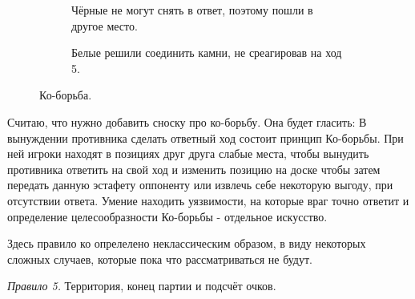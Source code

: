 \documentclass[14pt,a4paper]{extarticle}
\newcommand{\stone}[3]{\filldraw[color=black, fill=#3, very thick](#1,#2) circle(0.45);}
\newcommand{\stonelabel}[4]{\node[text=#3] at (#1,#2) {#4};}
\begin{document}
\begin{figure}[H]
    \begin{subfigure}[t]{0.4\textwidth}
    \caption{Чёрные не могут снять в ответ, поэтому пошли в другое место.}
    \label{9e}
    \end{subfigure}
    \hfill
    \begin{subfigure}[t]{0.4\textwidth}
    \caption{Белые решили соединить камни, не среагировав на ход 5.}
    \label{9f}
    \end{subfigure}
    \caption{Ко-борьба.}
    \label{9}
\end{figure}

Считаю, что нужно добавить сноску про ко-борьбу. Она будет гласить: В вынуждении противника сделать ответный ход состоит принцип Ко-борьбы. При ней игроки находят в позициях друг друга слабые места, чтобы вынудить противника ответить на свой ход и изменить позицию на доске чтобы затем передать данную эстафету оппоненту или извлечь себе некоторую выгоду, при отсутствии ответа. Умение находить уязвимости, на которые враг точно ответит и определение целесообразности Ко-борьбы - отдельное искусство.

Здесь правило ко опрелелено неклассическим образом, в виду некоторых сложных случаев, которые пока что рассматриваться не будут.

\textit{Правило 5.} Территория, конец партии и подсчёт очков.
\end{document}
